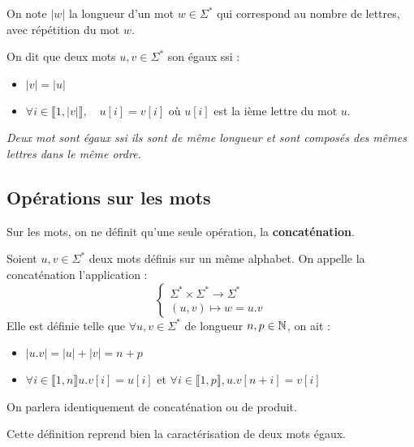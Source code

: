 \begin{definition}
    On note $|w|$ la longueur d'un mot $w \in \Sigma^*$ qui correspond au nombre de lettres, avec répétition du mot $w$. 
\end{definition}

\begin{definition}
    On dit que deux mots $u,v \in \Sigma^*$ son égaux ssi :
    \begin{itemize}
        \item $|v| = |u|$ 
        \item $\forall i \in \llbracket 1, |v| \rrbracket, \quad u[i] = v[i]$ où $u[i]$ est la ième lettre du mot $u$. 
    \end{itemize}
    \emph{Deux mot sont égaux ssi ils sont de même longueur et sont composés des mêmes lettres dans le même ordre.}
\end{definition}

\subsection{Opérations sur les mots}

Sur les mots, on ne définit qu'une seule opération, la \textbf{concaténation}. 

\begin{definition}[Concaténation]
    Soient $u,v \in \Sigma^*$ deux mots définis sur un même alphabet. On appelle la concaténation l'application :
    \[
        \begin{cases}
            \Sigma^* \times \Sigma^* \longrightarrow \Sigma^* \\ 
            (u,v) \longmapsto w = u.v
        \end{cases}
    \]
    Elle est définie telle que $ \forall u,v \in \Sigma^*$ de longueur $n,p \in \mathbb{N}$, on ait :
    \begin{itemize}
        \item $ |u.v| = |u| + |v| = n + p $
        \item $ \forall i \in \llbracket 1, n \rrbracket u.v[i] = u[i] $ et $ \forall i \in \llbracket 1,p \rrbracket, u.v[n+i] = v[i] $  
    \end{itemize}
    On parlera identiquement de concaténation ou de produit. 
\end{definition}

\begin{remark}
    Cette définition reprend bien la caractérisation de deux mots égaux. 
\end{remark}

